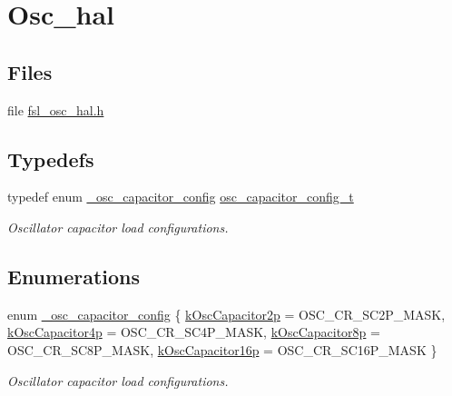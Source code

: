 \hypertarget{group__osc__hal}{}\section{Osc\+\_\+hal}
\label{group__osc__hal}
\subsection*{Files}
\begin{DoxyCompactItemize}
\item 
file \hyperlink{fsl__osc__hal_8h}{fsl\+\_\+osc\+\_\+hal.\+h}
\end{DoxyCompactItemize}
\subsection*{Typedefs}
\begin{DoxyCompactItemize}
\item 
typedef enum \hyperlink{group__osc__hal_ga16ed70cebc49879af6f12be1a893595e}{\+\_\+osc\+\_\+capacitor\+\_\+config} \hyperlink{group__osc__hal_ga1a1be2de080a498590bda0c9504f26f8}{osc\+\_\+capacitor\+\_\+config\+\_\+t}\hypertarget{group__osc__hal_ga1a1be2de080a498590bda0c9504f26f8}{}\label{group__osc__hal_ga1a1be2de080a498590bda0c9504f26f8}

\begin{DoxyCompactList}\small\item\em Oscillator capacitor load configurations. \end{DoxyCompactList}\end{DoxyCompactItemize}
\subsection*{Enumerations}
\begin{DoxyCompactItemize}
\item 
enum \hyperlink{group__osc__hal_ga16ed70cebc49879af6f12be1a893595e}{\+\_\+osc\+\_\+capacitor\+\_\+config} \{ \hyperlink{group__osc__hal_gga16ed70cebc49879af6f12be1a893595eaebd1254426bdca39d45962e6fa96aae8}{k\+Osc\+Capacitor2p} = O\+S\+C\+\_\+\+C\+R\+\_\+\+S\+C2\+P\+\_\+\+M\+A\+SK, 
\hyperlink{group__osc__hal_gga16ed70cebc49879af6f12be1a893595ea88bf8bd84051bcaa9b3e92513c8fa188}{k\+Osc\+Capacitor4p} = O\+S\+C\+\_\+\+C\+R\+\_\+\+S\+C4\+P\+\_\+\+M\+A\+SK, 
\hyperlink{group__osc__hal_gga16ed70cebc49879af6f12be1a893595eab1776582cbc311ef8efceed62e30192a}{k\+Osc\+Capacitor8p} = O\+S\+C\+\_\+\+C\+R\+\_\+\+S\+C8\+P\+\_\+\+M\+A\+SK, 
\hyperlink{group__osc__hal_gga16ed70cebc49879af6f12be1a893595ea479b914c5eb49cd49f2410c7d3e8c23b}{k\+Osc\+Capacitor16p} = O\+S\+C\+\_\+\+C\+R\+\_\+\+S\+C16\+P\+\_\+\+M\+A\+SK
 \}\begin{DoxyCompactList}\small\item\em Oscillator capacitor load configurations. \end{DoxyCompactList}
\end{DoxyCompactItemize}
